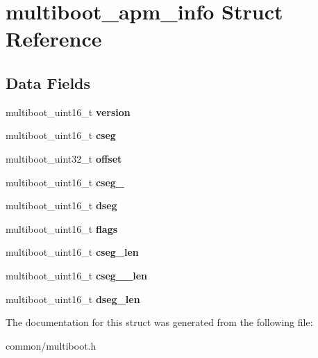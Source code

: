 \hypertarget{structmultiboot__apm__info}{}\section{multiboot\+\_\+apm\+\_\+info Struct Reference}
\label{structmultiboot__apm__info}
\subsection*{Data Fields}
\begin{DoxyCompactItemize}
\item 
multiboot\+\_\+uint16\+\_\+t {\bfseries version}\hypertarget{structmultiboot__apm__info_ab06d9309bdc00fa4a8c37fdab639beb5}{}\label{structmultiboot__apm__info_ab06d9309bdc00fa4a8c37fdab639beb5}

\item 
multiboot\+\_\+uint16\+\_\+t {\bfseries cseg}\hypertarget{structmultiboot__apm__info_a9eedcae62ee49310914e238d07094c4b}{}\label{structmultiboot__apm__info_a9eedcae62ee49310914e238d07094c4b}

\item 
multiboot\+\_\+uint32\+\_\+t {\bfseries offset}\hypertarget{structmultiboot__apm__info_a97958b174fe0234cafab9019eb009b91}{}\label{structmultiboot__apm__info_a97958b174fe0234cafab9019eb009b91}

\item 
multiboot\+\_\+uint16\+\_\+t {\bfseries cseg\+\_}\hypertarget{structmultiboot__apm__info_a9abc154a9c3a0f3d9ae96cf2b5044b43}{}\label{structmultiboot__apm__info_a9abc154a9c3a0f3d9ae96cf2b5044b43}

\item 
multiboot\+\_\+uint16\+\_\+t {\bfseries dseg}\hypertarget{structmultiboot__apm__info_a98cd7da8760cf5d49ba55e1f9e76c6d4}{}\label{structmultiboot__apm__info_a98cd7da8760cf5d49ba55e1f9e76c6d4}

\item 
multiboot\+\_\+uint16\+\_\+t {\bfseries flags}\hypertarget{structmultiboot__apm__info_a55fb7837ae61f63d0310b65767a2505c}{}\label{structmultiboot__apm__info_a55fb7837ae61f63d0310b65767a2505c}

\item 
multiboot\+\_\+uint16\+\_\+t {\bfseries cseg\+\_\+len}\hypertarget{structmultiboot__apm__info_a95aa6b556019e1b9c526b190341cc531}{}\label{structmultiboot__apm__info_a95aa6b556019e1b9c526b190341cc531}

\item 
multiboot\+\_\+uint16\+\_\+t {\bfseries cseg\+\_\+\_\+len}\hypertarget{structmultiboot__apm__info_a09573729600592739fe8f2480217a30d}{}\label{structmultiboot__apm__info_a09573729600592739fe8f2480217a30d}

\item 
multiboot\+\_\+uint16\+\_\+t {\bfseries dseg\+\_\+len}\hypertarget{structmultiboot__apm__info_afee11d31183fe424af90546b10c9fac2}{}\label{structmultiboot__apm__info_afee11d31183fe424af90546b10c9fac2}

\end{DoxyCompactItemize}


The documentation for this struct was generated from the following file\+:\begin{DoxyCompactItemize}
\item 
common/multiboot.\+h\end{DoxyCompactItemize}
